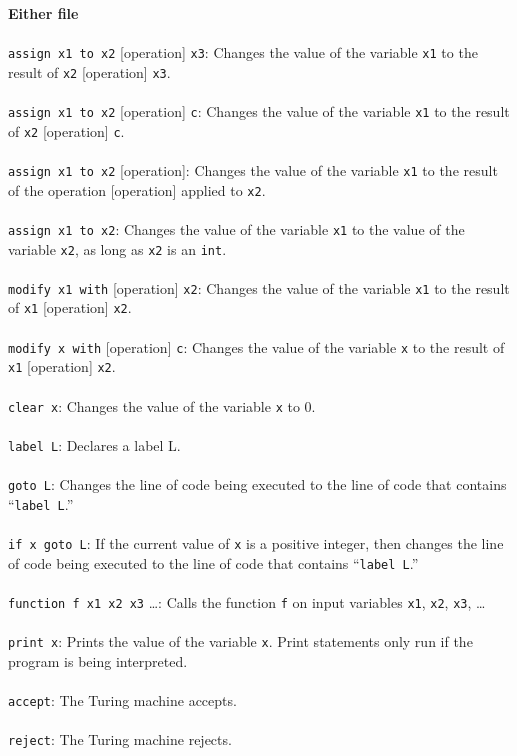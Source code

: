 \textbf{Either file} \\ \\
\texttt{assign x1 to x2} [operation] \texttt{x3}: Changes the value of the variable \texttt{x1} to the result of \texttt{x2} [operation] \texttt{x3}. \\ \\
\texttt{assign x1 to x2} [operation] \texttt{c}: Changes the value of the variable \texttt{x1} to the result of \texttt{x2} [operation] \texttt{c}. \\ \\
\texttt{assign x1 to x2} [operation]: Changes the value of the variable \texttt{x1} to the result of the operation [operation] applied to \texttt{x2}. \\ \\
\texttt{assign x1 to x2}: Changes the value of the variable \texttt{x1} to the value of the variable \texttt{x2}, as long as \texttt{x2} is an \texttt{int}. \\ \\
\texttt{modify x1 with} [operation] \texttt{x2}: Changes the value of the variable \texttt{x1} to the result of \texttt{x1} [operation] \texttt{x2}. \\ \\
\texttt{modify x with} [operation] \texttt{c}: Changes the value of the variable \texttt{x} to the result of \texttt{x1} [operation] \texttt{x2}. \\ \\
\texttt{clear x}: Changes the value of the variable \texttt{x} to 0. \\ \\
\texttt{label L}: Declares a label L. \\ \\
\texttt{goto L}: Changes the line of code being executed to the line of code that contains ``\texttt{label L}.'' \\ \\
\texttt{if x goto L}: If the current value of \texttt{x} is a positive integer, then changes the line of code being executed to the line of code that contains ``\texttt{label L}.'' \\ \\
\texttt{function f x1 x2 x3} \dots: Calls the function \texttt{f} on input variables \texttt{x1}, \texttt{x2}, \texttt{x3}, \dots \\ \\
\texttt{print x}: Prints the value of the variable \texttt{x}. Print statements only run if the program is being interpreted. \\ \\
\texttt{accept}: The Turing machine accepts. \\ \\ 
\texttt{reject}: The Turing machine rejects. 

